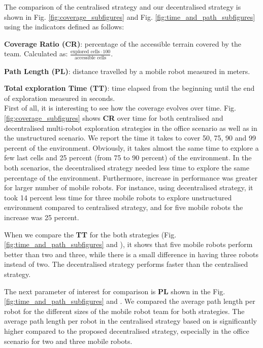 \documentclass[letterpaper, 10 pt, conference]{ieeeconf}  %
\begin{document}
The comparison of the centralised strategy and our decentralised strategy is shown in Fig. \ref{fig:coverage_subfigures} and Fig. \ref{fig:time_and_path_subfigures} using the indicators defined as follows:

\textbf{Coverage Ratio (CR)}: percentage of the accessible terrain covered by the team. Calculated as:  \( \frac{\text{explored cells} \cdot 100}{\text{accessible cells}} \).

\textbf{Path Length (PL)}: distance travelled by a mobile robot measured in meters.

\textbf{Total exploration Time (TT)}: time elapsed from the beginning until the end of exploration measured in seconds.\\

First of all, it is interesting to see how the coverage evolves over time. Fig. \ref{fig:coverage_subfigures} shows \textbf{CR} over time for both centralised and decentralised multi-robot exploration strategies in the office scenario as well as in the unstructured scenario. We report the time it takes to cover 50, 75, 90 and 99 percent of the environment. Obviously, it takes almost the same time to explore a few last cells and 25 percent (from 75 to 90 percent) of the environment. In the both scenarios, the decentralised strategy needed less time to explore the same percentage of the environment. Furthermore, increase in performance was greater for larger number of mobile robots. For instance, using decentralised strategy, it took 14 percent less time for three mobile robots to explore unstructured environment compared to centralised strategy, and for five mobile robots the increase was 25 percent.  

When we compare the \textbf{TT} for the both strategies (Fig. \ref{fig:time_and_path_subfigures}  and ), it shows that five mobile robots perform better than two and three, while there is a small difference in having three robots instead of two. The decentralised strategy performs faster than the centralised strategy.

The next parameter of interest for comparison is \textbf{PL} shown in the Fig. \ref{fig:time_and_path_subfigures}  and . We compared the average path length per robot for the different sizes of the mobile robot team for both strategies. The average path length per robot in the centralised strategy based on \cite{burgard} is significantly higher compared to the proposed decentralised strategy, especially in the office scenario for two and three mobile robots. 
\end{document}
